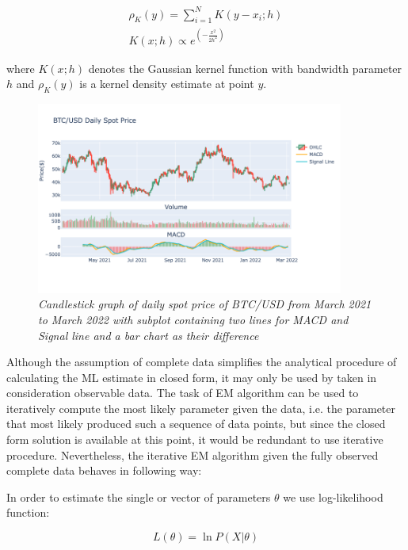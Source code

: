 \begin{gather} 
\rho_K(y) = \sum_{i=1}^{N} K(y - x_i;h)  \\
K(x;h) \propto e^{(-\frac{x^2}{2h^2})}
\end{gather}

where $K(x;h)$ denotes the Gaussian kernel function with bandwidth parameter $h$ and $\rho_K(y)$ is a kernel density estimate at point $y$.

\begin{figure}[h]

\begin{center}
	\includegraphics[width=0.9\textwidth]{MACD.png}
\end{center}

\caption{\textit{ Candlestick graph of daily spot price of BTC/USD from March 2021 to March 2022 with subplot containing two lines for MACD and Signal line and a bar chart as their difference}}

\end{figure}

Although the assumption of complete data simplifies the analytical procedure of calculating the ML estimate in closed form, it may only be used by taken in consideration observable data. The task of EM algorithm can be used to iteratively compute the most likely parameter given the data, i.e. the parameter that most likely produced such a sequence of data points, but since the closed form solution is available at this point, it would be redundant to use iterative procedure. Nevertheless, the iterative EM algorithm given the fully observed complete data behaves in following way:

In order to estimate the single or vector of parameters $\theta$ we use log-likelihood function:

\begin{equation}
L(\theta) = \ln P(X|\theta) 
\end{equation}

